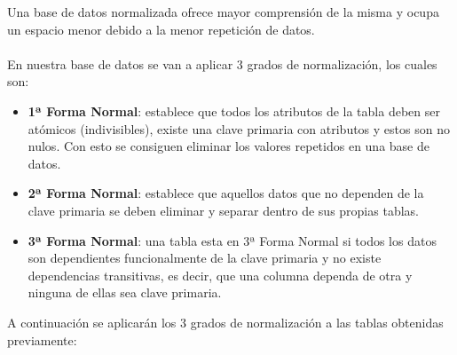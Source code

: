 Una base de datos normalizada ofrece mayor comprensión de la misma y ocupa un espacio menor debido a la menor repetición de datos.\\\\
En nuestra base de datos se van a aplicar 3 grados de normalización, los cuales son:
\begin{itemize}
\item \textbf{1ª Forma Normal}: establece que todos los atributos de la tabla deben ser atómicos (indivisibles),
existe una clave primaria con atributos y estos son no nulos. Con esto se consiguen eliminar los valores repetidos en una base de datos.
\item \textbf{2ª Forma Normal}: establece que aquellos datos que no dependen de la clave primaria se deben eliminar y separar dentro de sus propias tablas.
\item \textbf{3ª Forma Normal}: una tabla esta en 3ª Forma Normal si todos los datos son dependientes funcionalmente de la clave primaria y no existe dependencias transitivas, es decir, que una columna dependa de otra y ninguna de ellas sea clave primaria.
\end{itemize}

A continuación se aplicarán los 3 grados de normalización a las tablas obtenidas previamente:

